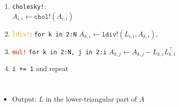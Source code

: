 \documentclass{beamer}
\begin{document}
\begin{frame}
\begin{columns}
\begin{tikzpicture}[thick, scale=1, transform shape]
   \end{tikzpicture}
    
    \begin{enumerate}
      \item<2-> \textcolor{themegreen}{\texttt{cholesky!}}: \\
      $A_{i,i} \leftarrow \texttt{chol!}(A_{i,i})$ 
      \item<3-> \textcolor{orange}{\texttt{ldiv!}}: \texttt{for k in 2:N} 
      $A_{k,i} \leftarrow \texttt{ldiv!}(L_{i,i}, A_{k,i}),$
      \item<4-> \textcolor{red}{\texttt{mul!}} \texttt{for k in 2:N, j in 2:i}
      $A_{k,j} \leftarrow A_{k,j} - L_{k,i}L^\top_{k,i}$
      \item<5-> \texttt{i += 1} and repeat
    \end{enumerate}
  \end{columns}
  
  \bigskip
  \begin{itemize}  
    \item<6-> Output: $L$ in the lower-triangular part of $A$
  \end{itemize}

\end{frame}
\end{document}
